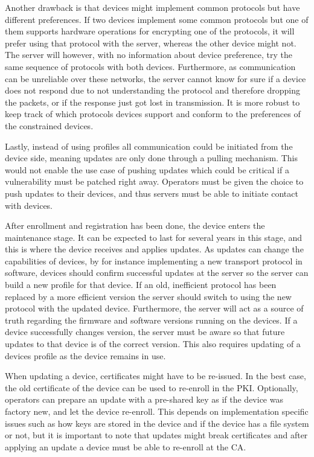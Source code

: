 \documentclass[0-thesis.tex]{subfiles}
\begin{document}
Another drawback is that devices might implement common protocols but have different
preferences. If two devices implement some common protocols but one of them supports
hardware operations for encrypting one of the protocols, it will prefer using that
protocol with the server, whereas the other device might not. The server will however,
with no information about device preference, try the same sequence of protocols with both
devices. Furthermore, as communication can be unreliable over these networks, the server
cannot know for sure if a device does not respond due to not understanding the protocol
and therefore dropping the packets, or if the response just got lost in transmission. It
is more robust to keep track of which protocols devices support and conform to the
preferences of the constrained devices.

Lastly, instead of using profiles all communication could be initiated from the device
side, meaning updates are only done through a pulling mechanism. This would not enable the
use case of pushing updates which could be critical if a vulnerability must be patched
right away. Operators must be given the choice to push updates to their devices, and thus
servers must be able to initiate contact with devices.

After enrollment and registration has been done, the device enters the maintenance stage.
It can be expected to last for several years in this stage, and this is where the device
receives and applies updates. As updates can change the capabilities of devices, by for
instance implementing a new transport protocol in software, devices should confirm
successful updates at the server so the server can build a new profile for that device. If
an old, inefficient protocol has been replaced by a more efficient version the server
should switch to using the new protocol with the updated device. Furthermore, the server
will act as a source of truth regarding the firmware and software versions running on the
devices. If a device successfully changes version, the server must be aware so that future
updates to that device is of the correct version. This also requires updating of a devices
profile as the device remains in use. 

When updating a device, certificates might have to be re-issued. In the best case, the old
certificate of the device can be used to re-enroll in the PKI. Optionally, operators can
prepare an update with a pre-shared key as if the device was factory new, and let the
device re-enroll. This depends on implementation specific issues such as how keys are
stored in the device and if the device has a file system or not, but it is important to
note that updates might break certificates and after applying an update a device must be
able to re-enroll at the CA.
\end{document}
